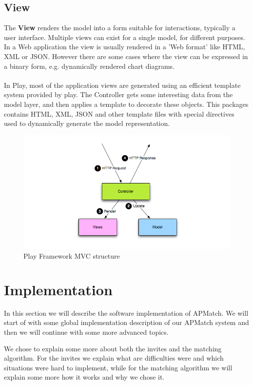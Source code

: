 \subsection{View}
The \textbf{View} renders the model into a form suitable for interactions, typically a user interface.
Multiple views can exist for a single model, for different purposes.
In a Web application the view is usually rendered in a 'Web format' like HTML, XML or JSON.
However there are some cases where the view can be expressed in a binary form, e.g. dynamically rendered chart diagrams.
\\\\
In Play, most of the application views are generated using an efficient template system provided by play. 
The Controller gets some interesting data from the model layer, and then applies a template to decorate these objects. 
This packages contains HTML, XML, JSON and other template files with special directives used to dynamically generate the model representation.
\\
\begin{figure}[h]
  \centering
    \captionsetup{justification=centering}
    \includegraphics[width=\textwidth]{play_mvc}
    \caption{Play Framework MVC structure}
  \label{play_mvc_image}
\end{figure}


\section{Implementation}
In this section we will describe the software implementation of APMatch.
We will start of with some global implementation description of our APMatch system and then we will continue with some more advanced topics.

We chose to explain some more about both the invites and the matching algorithm.
For the invites we explain what are difficulties were and which situations were hard to implement, while for the matching algorithm we will explain some more how it works and why we chose it.

